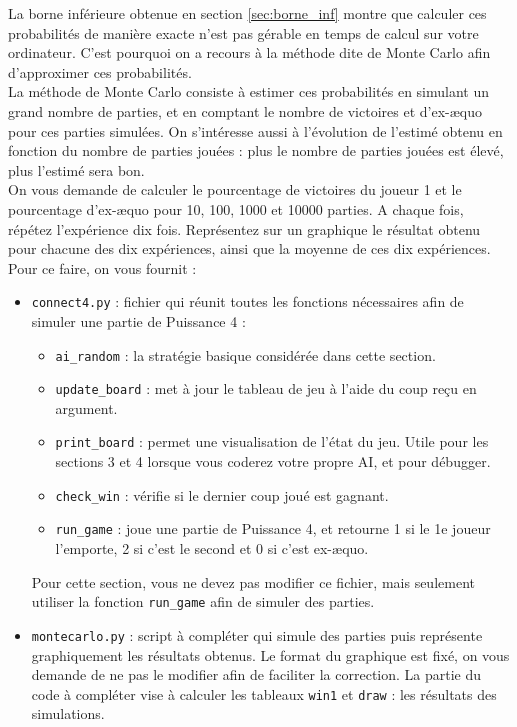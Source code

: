 \documentclass[11pt,answers]{exam}
\begin{document}
La borne inférieure obtenue en section \ref{sec:borne_inf} montre que calculer ces probabilités de manière exacte n'est pas gérable en temps de calcul sur votre ordinateur. C'est pourquoi on a recours à la méthode dite de Monte Carlo afin d'approximer ces probabilités.\\

La méthode de Monte Carlo consiste à estimer ces probabilités en simulant un grand nombre de parties, et en comptant le nombre de victoires et d'ex-æquo pour ces parties simulées. On s'intéresse aussi à l'évolution de l'estimé obtenu en fonction du nombre de parties jouées : plus le nombre de parties jouées est élevé, plus l'estimé sera bon.\\

On vous demande de calculer le pourcentage de victoires du joueur 1 et le pourcentage d'ex-æquo pour 10, 100, 1000 et 10000 parties. A chaque fois, répétez l'expérience dix fois. Représentez sur un graphique le résultat obtenu pour chacune des dix expériences, ainsi que la moyenne de ces dix expériences. Pour ce faire, on vous fournit :

\begin{itemize}
    \item \texttt{connect4.py} : fichier qui réunit toutes les fonctions nécessaires afin de simuler une partie de Puissance 4 :
    \begin{itemize}
        \item \texttt{ai\_random} : la stratégie basique considérée dans cette section.
        \item \texttt{update\_board} : met à jour le tableau de jeu à l'aide du coup reçu en argument.
        \item \texttt{print\_board} : permet une visualisation de l'état du jeu. Utile pour les sections 3 et 4 lorsque vous coderez votre propre AI, et pour débugger.
        \item \texttt{check\_win} : vérifie si le dernier coup joué est gagnant.
        \item \texttt{run\_game} : joue une partie de Puissance 4, et retourne 1 si le 1e joueur l'emporte, 2 si c'est le second et 0 si c'est ex-æquo.
    \end{itemize}
    Pour cette section, vous ne devez pas modifier ce fichier, mais seulement utiliser la fonction \texttt{run\_game} afin de simuler des parties.
    \item \texttt{montecarlo.py} : script à compléter qui simule des parties puis représente graphiquement les résultats obtenus. Le format du graphique est fixé, on vous demande de ne pas le modifier afin de faciliter la correction. La partie du code à compléter vise à calculer les tableaux \texttt{win1} et \texttt{draw} : les résultats des simulations.
\end{itemize}
\end{document}

